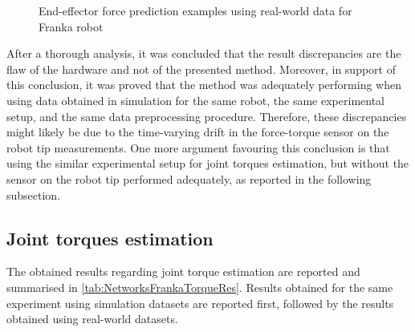 \begin{figure}
    \vfil
    \hfil
    \caption{End-effector force prediction examples using real-world data for Franka robot}
    \label{fig:RealGraphs}
\end{figure}

After a thorough analysis, it was concluded that the result discrepancies are the flaw of the hardware and not of the presented method. Moreover, in support of this conclusion, it was proved that the method was adequately performing when using data obtained in simulation for the same robot, the same experimental setup, and the same data preprocessing procedure. Therefore, these discrepancies might likely be due to the time-varying drift in the force-torque sensor on the robot tip measurements. One more argument favouring this conclusion is that using the similar experimental setup for joint torques estimation, but without the sensor on the robot tip performed adequately, as reported in the following subsection.

\subsection{Joint torques estimation}
\label{sec:ResJoint}

The obtained results regarding joint torque estimation are reported and summarised in \cref{tab:NetworksFrankaTorqueRes}. Results obtained for the same experiment using simulation datasets are reported first, followed by the results obtained using real-world datasets.

